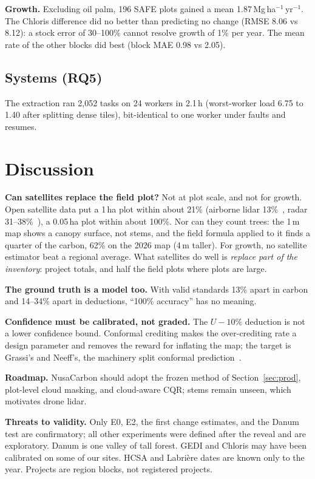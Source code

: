 \documentclass[conference,a4paper]{IEEEtran}
\newcommand{\Mgha}{\,Mg\,ha$^{-1}$}
\begin{document}
\textbf{Growth.} Excluding oil palm, 196 SAFE plots gained a mean 1.87\Mgha\,yr$^{-1}$. The Chloris difference did no better than predicting no change (RMSE 8.06 vs 8.12): a stock error of 30--100\% cannot resolve growth of 1\% per year. The mean rate of the other blocks did best (block MAE 0.98 vs 2.05).

\subsection{Systems (RQ5)}
The extraction ran 2{,}052 tasks on 24 workers in 2.1\,h (worst-worker load 6.75 to 1.40 after splitting dense tiles), bit-identical to one worker under faults and resumes.

\section{Discussion}
\textbf{Can satellites replace the field plot?} Not at plot scale, and not for growth. Open satellite data put a 1\,ha plot within about 21\% (airborne lidar 13\%~\cite{jucker2018estimating}, radar 31--38\%~\cite{berninger2018sar}), a 0.05\,ha plot within about 100\%. Nor can they count trees: the 1\,m map shows a canopy surface, not stems, and the field formula applied to it finds a quarter of the carbon, 62\% on the 2026 map (4\,m taller). For growth, no satellite estimator beat a regional average. What satellites do well is \emph{replace part of the inventory}: project totals, and half the field plots where plots are large.

\textbf{The ground truth is a model too.} With valid standards 13\% apart in carbon and 14--34\% apart in deductions, ``100\% accuracy'' has no meaning.

\textbf{Confidence must be calibrated, not graded.} The $U-10\%$ deduction is not a lower confidence bound. Conformal crediting makes the over-crediting rate a design parameter and removes the reward for inflating the map; the target is Grassi's and Neeff's, the machinery split conformal prediction~\cite{lei2018distribution,zhang2026conformal}.

\textbf{Roadmap.} NusaCarbon should adopt the frozen method of Section~\ref{sec:prod}, plot-level cloud masking, and cloud-aware CQR; stems remain unseen, which motivates drone lidar.

\textbf{Threats to validity.} Only E0, E2, the first change estimates, and the Danum test are confirmatory; all other experiments were defined after the reveal and are exploratory. Danum is one valley of tall forest. GEDI and Chloris may have been calibrated on some of our sites. HCSA and Labri\`ere dates are known only to the year. Projects are region blocks, not registered projects.
\end{document}
